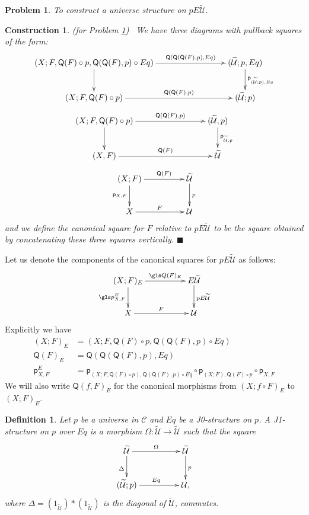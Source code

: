 \documentclass[12pt]{article}
\numberwithin{equation}{section}
\newenvironment{eq}{\begin{equation}}{\end{equation}}
\newtheorem{definition}[proposition]{Definition}
\newtheorem{problem}[proposition]{Problem}
\newtheorem{construction0}[proposition]{Construction}
\newenvironment{construction}[1]{\begin{construction0}(for Problem \ref{#1})\ }{$\blacksquare$ \end{construction0}}
\newcommand{\llabel}[1]{\label{#1}}
\newcommand{\sr}{\rightarrow}
\newcommand{\wt}{\widetilde}
\newcommand{\id}{1}            %
\newcommand{\p}{\mathsf{p}}
\newcommand{\U}{\mathcal{U}}
\newcommand{\Q}{\mathsf{Q}}
\begin{document}
\begin{problem}
\llabel{2015.05.08.prob1} To construct a universe structure on $pE\wt{\U}$.
\end{problem}
%
\begin{construction}{2015.05.08.prob1}\rm
\llabel{2015.05.08.constr1} We have three diagrams with pullback squares of the
form:
%
$$
\begin{xy}
          \xymatrix@C=7pc{ (X;F,\Q(F)\circ p, \Q(\Q(F),p)\circ Eq)
            \ar[r]^-{\Q(\Q(\Q(F),p),Eq)} \ar[d] & (\wt{\U}; p, Eq)
            \ar[d]^{\p_{(\wt{\U};p),Eq}}\\ (X;F,\Q(F)\circ p) \ar[r]^-{\Q(\Q(F),p)}
            & (\wt{\U};p) }
\end{xy}
$$
$$
\begin{xy}
          \xymatrix@C=7pc{ (X;F,\Q(F)\circ p) \ar[r]^-{\Q(\Q(F),p)} \ar[d] &
            (\wt{\U},p) \ar[d]^{\p_{\wt{\U},p}}\\ (X,F) \ar[r]^-{\Q(F)} & \wt{\U} }
\end{xy}
$$
$$
\begin{xy}
          \xymatrix@C=4pc{ (X;F) \ar[r]^-{\Q(F)} \ar[d]_{\p_{X,F}} & \wt{\U}
            \ar[d]^{p}\\ X \ar[r]^{F} & \U }
\end{xy}
$$
%
and we define the canonical square for $F$ relative to $pE\wt{\U}$ to be the
square obtained by concatenating these three squares vertically.
\end{construction}
%
Let us denote the components of the canonical squares for $pE\wt{\U}$ as
follows:
%
$$
\begin{xy}
          \xymatrix@C=4pc{ (X;F)_{E} \ar[r]^-{\gls Q(F)_{E}} \ar[d]_{\gls p^E_{X,F}} &
            E\wt{\U} \ar[d]^{pE\wt{\U}}\\ X \ar[r]^{F} & \U }
\end{xy}
$$
%
Explicitly we have
%
\begin{align*}
  (X;F)_{E}&=(X;F,\Q(F)\circ p, \Q(\Q(F),p)\circ Eq) \\
  \Q(F)_{E}&=\Q(\Q(\Q(F),p),Eq) \\
  \p_{X,F}^E&=\p_{(X;F,\Q(F)\circ p),\Q(\Q(F),p)\circ Eq}\circ \p_{(X;F),\Q(F)\circ p}\circ \p_{X,F}
\end{align*}
%
We will also write $\Q(f,F)_{E}$ for the canonical morphisms from $(X;f\circ
F)_{E}$ to $(X;F)_{E}$.
%
\begin{definition}
\llabel{2015.03.27.def5} Let $p$ be a universe in $\mathcal C$ and $Eq$ be a
J0-structure on $p$. A J1-structure on $p$ over $Eq$ is a morphism
$\Omega:\wt{\U}\sr \wt{\U}$ such that the square
%
\begin{eq}\llabel{2015.03.27.sq1}
\begin{xy}
          \xymatrix@C=4pc{ \wt{\U} \ar[r]^-{\Omega} \ar[d]_{\Delta} & \wt{\U}
            \ar[d]^{p}\\ (\wt{\U};p) \ar[r]^{Eq} & \U, }
\end{xy}
\end{eq}%
%
where $\Delta=(\id_{\wt{\U}})*(\id_{\wt{\U}})$ is the diagonal of $\wt{\U}$,
commutes.
\end{definition}
%
\end{document}

